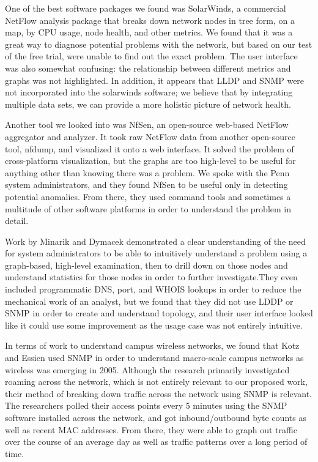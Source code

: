 \documentclass{sig-alternate}
\begin{document}
One of the best software packages we found was SolarWinds, a commercial NetFlow
analysis package that breaks down network nodes in tree form, on a map, by CPU
usage, node health, and other metrics.\cite{SolarWinds} We found that it was a
great way to diagnose potential problems with the network, but based on our test
of the free trial, were unable to find out the exact problem. The user interface
was also somewhat confusing: the relationship between different metrics and
graphs was not highlighted. In addition, it appears that LLDP and SNMP were not
incorporated into the solarwinds software; we believe that by integrating
multiple data sets, we can provide a more holistic picture of network health.

Another tool we looked into was NfSen, an open-source web-based NetFlow
aggregator and analyzer.\cite{NfSen} It took raw NetFlow data from another
open-source tool, nfdump, and visualized it onto a web interface. It solved the
problem of cross-platform visualization, but the graphs are too high-level to be
useful for anything other than knowing there was a problem. We spoke with the
Penn system administrators, and they found NfSen to be useful only in detecting
potential anomalies. From there, they used command tools and sometimes a
multitude of other software platforms in order to understand the problem in
detail. 

Work by Minarik and Dymacek\cite{Minarik08} demonstrated a clear understanding
of the need for system administrators to be able to intuitively understand a
problem using a graph-based, high-level examination, then to drill down on those
nodes and understand statistics for those nodes in order to further
investigate.They even included programmatic DNS, port, and WHOIS lookups in
order to reduce the mechanical work of an analyst, but we found that they did
not use LDDP or SNMP in order to create and understand topology, and their user
interface looked like it could use some improvement as the usage case was not
entirely intuitive.

In terms of work to understand campus wireless networks, we found that Kotz and
Essien\cite{Kotz05} used SNMP in order to understand macro-scale campus networks as
wireless was emerging in 2005. Although the research primarily investigated
roaming across the network, which is not entirely relevant to our proposed work,
their method of breaking down traffic across the network using SNMP is relevant.
The researchers polled their access points every 5 minutes using the SNMP
software installed across the network, and got inbound/outbound byte counts as
well as recent MAC addresses. From there, they were able to graph out traffic
over the course of an average day as well as traffic patterns over a long period
of time.
\end{document}
